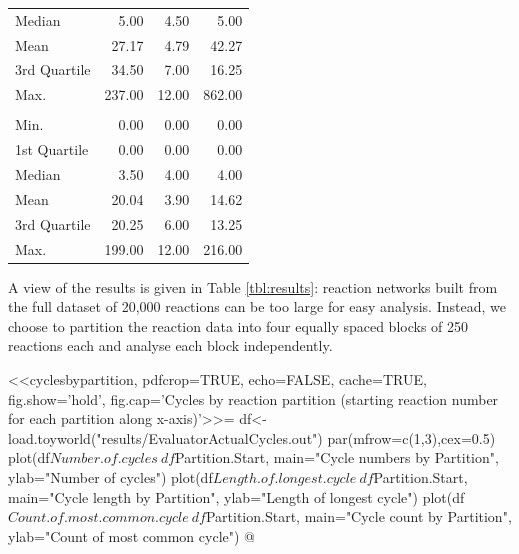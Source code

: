 \begin{table}[htbp]
\begin{center}
\begin{tabular}{lrrr}
			Median       & 5.00             & 4.50                    & 5.00                       \\
			Mean         & 27.17            & 4.79                    & 42.27                      \\
			3rd Quartile & 34.50            & 7.00                    & 16.25                      \\
			Max.         & 237.00           & 12.00                   & 862.00                     \\
			\hline\noalign{\smallskip}
			\multicolumn{4}{c}{Reactions 19750 to 20000}\\
			\hline\noalign{\smallskip}
			Min.         & 0.00             & 0.00                    & 0.00                       \\
			1st Quartile & 0.00             & 0.00                    & 0.00                       \\
			Median       & 3.50             & 4.00                    & 4.00                       \\
			Mean         & 20.04            & 3.90                    & 14.62                      \\
			3rd Quartile & 20.25            & 6.00                    & 13.25                      \\
			Max.         & 199.00           & 12.00                   & 216.00                     \\
			\hline
		\end{tabular}
	\end{center}
\end{table}%

A view of the results is given in Table \cref{tbl:results}: reaction networks built from the full dataset of 20,000 reactions can be too large for easy analysis. Instead, we choose to partition the reaction data into four equally spaced blocks of 250 reactions each and analyse each block independently.


<<cyclesbypartition, pdfcrop=TRUE, echo=FALSE, cache=TRUE, fig.show='hold', fig.cap='Cycles by reaction partition (starting reaction number for each partition along x-axis)'>>=
df<-load.toyworld("results/EvaluatorActualCycles.out")
par(mfrow=c(1,3),cex=0.5)
plot(df$Number.of.cycles~df$Partition.Start, main="Cycle numbers by Partition", ylab="Number of cycles")
plot(df$Length.of.longest.cycle~df$Partition.Start, main="Cycle length by Partition", ylab="Length of longest cycle")
plot(df$Count.of.most.common.cycle~df$Partition.Start, main="Cycle count by Partition", ylab="Count of most common cycle")
@
\label{fig:partitions}

